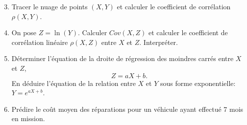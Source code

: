 {{\begin{enumerate}
    \setcounter{enumi}{2}
    \item Tracer le nuage de points \( (X, Y) \) et calculer le coefficient de corrélation $\rho(X,Y)$.
\end{enumerate}

\begin{enumerate}
    \setcounter{enumi}{3}
    \item On pose $Z = \ln(Y)$. Calculer $Cov(X,Z)$ et calculer le coefficient de corrélation linéaire $\rho(X,Z)$ entre $X$ et $Z$. Interpréter.
   \item  Déterminer l’équation de la droite de régression des moindres carrés entre \( X \) et $ Z$, $$Z = aX + b.$$
    En déduire l’équation de la relation entre \( X \) et \( Y \) sous forme exponentielle: $Y = e^{aX + b}$.
    \item Prédire le coût moyen des réparations pour un véhicule ayant effectué 7 mois en mission.

 
\end{enumerate}






}
}